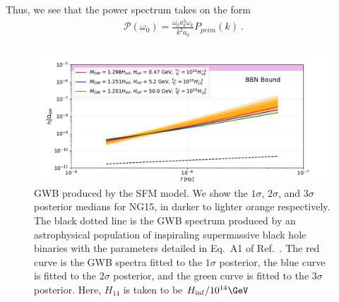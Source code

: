 Thus, we see that the power spectrum takes on the form 
\begin{equation}\label{eqn:18}
    \begin{multlined}
    \mathcal{P}(\omega_0)  = \frac{\omega_0 a_k^3 \omega_k}{k^2 a_0} P_{prim}(k)\ .
    \end{multlined}
\end{equation}




\onecolumngrid
\begin{figure}
\includegraphics[width=\textwidth]{fig/fig8.pdf} 
\caption{GWB produced by the SFM model. We show the $1\sigma$, $2\sigma$, and $3\sigma$ posterior medians for NG15, in darker to lighter orange respectively. The black dotted line is the GWB spectrum produced by an astrophysical population of inspiraling supermassive black hole binaries with the parameters detailed in Eq.\ A1 of Ref.\ \cite{Afzal:2023}. The red curve is the GWB spectra fitted to the $1\sigma$ posterior, the blue curve is fitted to the $2\sigma$ posterior, and the green curve is fitted to the $3\sigma$ posterior. Here, $H_{14}$ is taken to be $H_{\inf} / 10^{14} \GeV$}
\label{fig:GWB}
\end{figure}
\twocolumngrid



